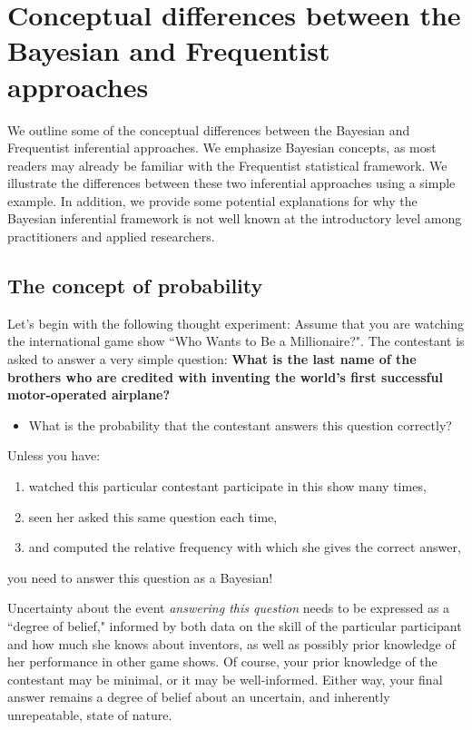 \chapter{Conceptual differences between the Bayesian and Frequentist approaches}\label{chap2}

We outline some of the conceptual differences between the Bayesian and Frequentist inferential approaches. We emphasize Bayesian concepts, as most readers may already be familiar with the Frequentist statistical framework. We illustrate the differences between these two inferential approaches using a simple example. In addition, we provide some potential explanations for why the Bayesian inferential framework is not well known at the introductory level among practitioners and applied researchers.

\section{The concept of probability}\label{sec21}

Let's begin with the following thought experiment: Assume that you are watching the international game show ``Who Wants to Be a Millionaire?". The contestant is asked to answer a very simple question: \textbf{What is the last name of the brothers who are credited with inventing the world's first successful motor-operated airplane?}

\begin{itemize}
	\item What is the probability that the contestant answers this question correctly? 
\end{itemize}

Unless you have: 

\begin{enumerate}
	\item watched this particular contestant participate in this show many times,
	\item seen her asked this same question each time, 
	\item and computed the relative frequency with which she gives the correct answer,   
\end{enumerate}

you need to answer this question as a Bayesian!

Uncertainty about the event \textit{answering this question} needs to be expressed as a ``degree of belief," informed by both data on the skill of the particular participant and how much she knows about inventors, as well as possibly prior knowledge of her performance in other game shows. Of course, your prior knowledge of the contestant may be minimal, or it may be well-informed. Either way, your final answer remains a degree of belief about an uncertain, and inherently unrepeatable, state of nature.

